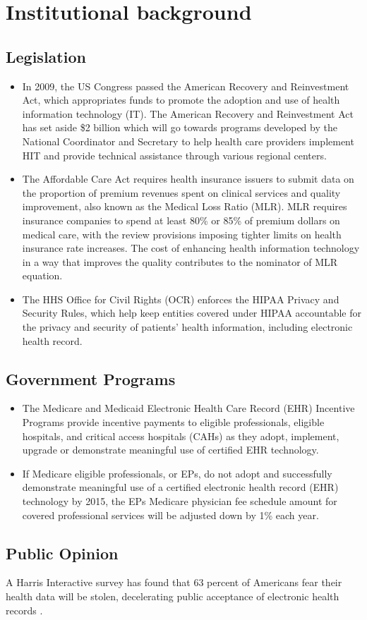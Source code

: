 \section{Institutional background}
\subsection{Legislation}
\begin{itemize}
\item In 2009, the US Congress passed the American Recovery and Reinvestment Act, which appropriates funds to promote the adoption and use of health information technology (IT). The American Recovery and Reinvestment Act has set aside \$2 billion which will go towards programs developed by the National Coordinator and Secretary to help health care providers implement HIT and provide technical assistance through various regional centers.
\item The Affordable Care Act requires health insurance issuers to submit data on the proportion of premium revenues spent on clinical services and quality improvement, also known as the Medical Loss Ratio (MLR). MLR requires insurance companies to spend at least 80\% or 85\% of premium dollars on medical care, with the review provisions imposing tighter limits on health insurance rate increases. The cost of enhancing health information technology in a way that improves the quality contributes to the nominator of MLR equation.
\item  The HHS Office for Civil Rights (OCR) enforces the HIPAA Privacy and Security Rules, which help keep entities covered under HIPAA accountable for the privacy and security of patients' health information, including electronic health record.
\end{itemize}

\subsection{Government Programs}
\begin{itemize}
\item The Medicare and Medicaid Electronic Health Care Record (EHR) Incentive Programs provide incentive payments to eligible professionals, eligible hospitals, and critical access hospitals (CAHs) as they adopt, implement, upgrade or demonstrate meaningful use of certified EHR technology.
\item If Medicare eligible professionals, or EPs, do not adopt and successfully demonstrate meaningful use of a certified electronic health record (EHR) technology by 2015, the EPs Medicare physician fee schedule amount for covered professional services will be adjusted down by 1\% each year.
\end{itemize}

\subsection{Public Opinion}
A Harris Interactive survey has found that 63 percent of Americans fear their health data will be stolen, decelerating public acceptance of electronic health records \citep{Kaiser2012}.

